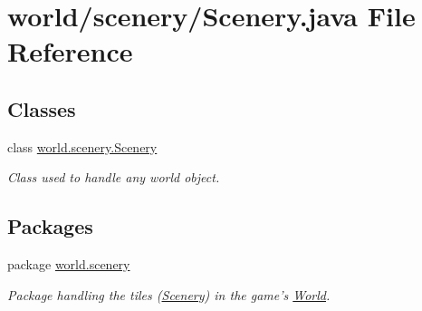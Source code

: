 \hypertarget{a00070}{\section{world/scenery/\-Scenery.java File Reference}
\label{a00070}
}
\subsection*{Classes}
\begin{DoxyCompactItemize}
\item 
class \hyperlink{a00024}{world.\-scenery.\-Scenery}
\begin{DoxyCompactList}\small\item\em Class used to handle any world object. \end{DoxyCompactList}\end{DoxyCompactItemize}
\subsection*{Packages}
\begin{DoxyCompactItemize}
\item 
package \hyperlink{a00091}{world.\-scenery}
\begin{DoxyCompactList}\small\item\em Package handling the tiles (\hyperlink{a00024}{Scenery}) in the game's \hyperlink{a00039}{World}. \end{DoxyCompactList}\end{DoxyCompactItemize}

